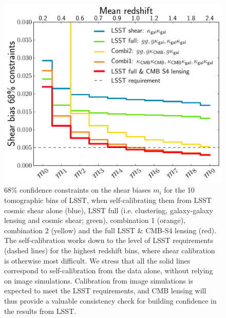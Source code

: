 \begin{figure}[htbp]
\centering
\includegraphics[width=0.7\columnwidth]{CMBLensing/LSST_summary_m.pdf}
\caption{$68\%$ confidence constraints on the shear biases $m_i$ for the 10 tomographic bins of LSST, when self-calibrating them from LSST cosmic shear alone (blue), LSST full (i.e. clustering, galaxy-galaxy lensing and cosmic shear; green), combination 1 (orange), combination 2 (yellow) and the full LSST \& CMB-S4 lensing (red). The self-calibration works down to the level of LSST requirements (dashed lines) for the highest redshift bins, where shear calibration is otherwise most difficult. We stress that all the solid lines correspond to self-calibration from the data alone, without relying on image simulations. Calibration from image simulations is expected to meet the LSST requirements, and CMB lensing will thus provide a valuable consistency check for building confidence in the results from LSST.}
\label{shear_calibration_cmbs4}
\end{figure}


